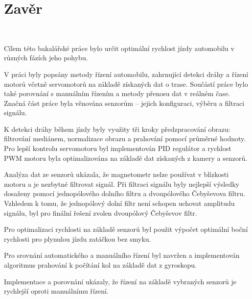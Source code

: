 \chapter{Zavěr}
\label{sec:End}
\vspace{-20pt}
\

Cílem této bakalářské práce bylo určit optimální rychlost jízdy automobilu v různých fázích jeho pohybu.

V práci byly popsány metody řízení automobilu, zahrnující detekci dráhy a řízení motorů včetně 
servomotorů na základě získaných dat o trase. Součástí práce bylo také porovnání s manuálním řízením a 
metody přenosu dat v reálném čase. Značná část práce byla věnována senzorům – jejich konfiguraci, výběru 
a filtraci signálu.

K detekci dráhy během jízdy byly využity tři kroky předzpracování obrazu: filtrování mediánem, 
normalizace obrazu a prahování pomocí průměrné hodnoty. Pro lepší kontrolu servomotoru byl implementován 
PID regulátor a rychlost PWM motoru byla optimalizována na základě dat získaných z kamery a senzorů.

Analýza dat ze senzorů ukázala, že magnetometr nelze používat v blízkosti motoru a je nezbytné filtrovat 
signál. Při filtraci signálu byly nejlepší výsledky dosaženy pomocí jednopólového dolního filtru a 
dvoupólového Čebyševova filtru. Vzhledem k tomu, že jednopólový dolní filtr není schopen uchovat 
amplitudu signálu, byl pro finální řešení zvolen dvoupólový Čebyševov filtr.

Pro optimalizaci rychlosti na základě senzorů byl použit výpočet optimální boční rychlosti pro plynulou 
jízdu zatáčkou bez smyku.

Pro srovnání automatického a manuálního řízení byl navržen a implementován algoritmus prahování 
k počítání kol na základě dat z gyroskopu.

Implementace a porovnání ukázaly, že řízení na základě vybraných senzorů je rychlejší oproti manuálnímu 
řízení.

\endinput
